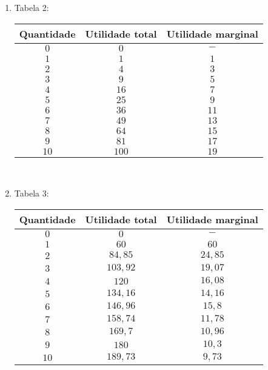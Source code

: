 \documentclass[a4paper, 12pt]{article}
\begin{document}
\begin{enumerate}
\begin{enumerate}
		\item Tabela 2:
		\begin{table}[H]
			\centering
			\begin{tabular}{|c|c|c|}
				\hline
				Quantidade & Utilidade total & Utilidade marginal \\ \hline
				$0$ & $0$ & $-$\\ \hline
				$1$ & $1$ & $1$\\ \hline
				$2$ & $4$ & $3$\\ \hline
				$3$ & $9$ & $5$\\ \hline
				$4$ & $16$ & $7$\\ \hline
				$5$ & $25$ & $9$\\ \hline
				$6$ & $36$ & $11$\\ \hline
				$7$ & $49$ & $13$\\ \hline
				$8$ & $64$ & $15$\\ \hline
				$9$ & $81$ & $17$\\ \hline
				$10$ & $100$ & $19$\\ \hline
			\end{tabular}
		\end{table}\\
		\newpage
		
		\item Tabela 3:
		\begin{table}[H]
			\centering
			\begin{tabular}{|c|c|c|}
				\hline
				Quantidade & Utilidade total & Utilidade marginal \\ \hline
				$0$ & $0$ & $-$\\ \hline
				$1$ & $60$ & $60$\\ \hline
				$2$ & $84,85$ & $24,85$\\ \hline
				$3$ & $103,92$ & $19,07$\\ \hline
				$4$ & $120$ & $16,08$\\ \hline
				$5$ & $134,16$ & $14,16$\\ \hline
				$6$ & $146,96$ & $15,8$\\ \hline
				$7$ & $158,74$ & $11,78$\\ \hline
				$8$ & $169,7$ & $10,96$\\ \hline
				$9$ & $180$ & $10,3$\\ \hline
				$10$ & $189,73$ & $9,73$\\ \hline
			\end{tabular}
		\end{table}\\
		

\end{enumerate}
\end{enumerate}
\end{document}

